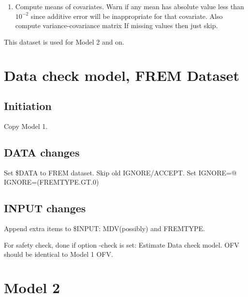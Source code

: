 \begin{enumerate}
	\item Compute means of %
    covariates. Warn if any mean %
    has absolute value less than $10^{-2}$ since additive error will be inappropriate for that covariate.
    Also compute variance-covariance matrix %
    If missing values then just skip.
\end{enumerate}

This dataset is used for Model 2 and on.

\section{Data check model, FREM Dataset}
\subsection{Initiation}
Copy Model 1.

\subsection{DATA changes}
Set \$DATA to FREM dataset. Skip old IGNORE/ACCEPT. Set IGNORE=@ IGNORE=(FREMTYPE.GT.0)

\subsection{INPUT changes}
Append extra items to \$INPUT: MDV(possibly) and FREMTYPE.

For safety check, done if option -check is set: Estimate Data check model. OFV should be identical to Model 1 OFV.


\section{Model 2}



